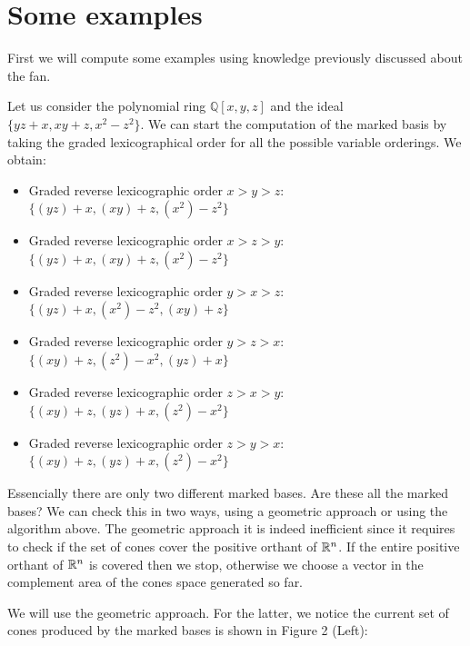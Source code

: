 \section{Some examples}

First we will compute some examples using knowledge previously
discussed about the \grob fan.

\begin{example}
  Let us consider the polynomial ring $\mathbb{Q}[x, y, z]$ and
  the ideal $\{yz + x, xy + z, x^2 -z^2\}$. We can start the computation
  of the marked \grob basis by taking the graded lexicographical order for
  all the possible variable orderings. We obtain:

  \begin{itemize}
  \item Graded reverse lexicographic order $x > y > z$: $\{(yz)+x, (xy)+z, (x^2)-z^2\}$
  \item Graded reverse lexicographic order $x > z > y$: $\{(yz)+x, (xy)+z, (x^2)-z^2\}$
  \item Graded reverse lexicographic order $y > x > z$: $\{(yz)+x, (x^2)-z^2, (xy)+z\}$
  \item Graded reverse lexicographic order $y > z > x$: $\{(xy)+z, (z^2)-x^2, (yz)+x\}$
  \item Graded reverse lexicographic order $z > x > y$: $\{(xy)+z, (yz)+x, (z^2)-x^2\}$
  \item Graded reverse lexicographic order $z > y > x$: $\{(xy)+z, (yz)+x, (z^2)-x^2\}$
  \end{itemize}

  Essencially there are only two different marked \grob bases. Are these all the marked \grob bases?
  We can check this in two ways, using a geometric approach or using the algorithm above. The
  geometric approach it is indeed inefficient since it requires to check if the set of cones
  cover the positive orthant of $\mathbb{R}^n$. If the entire positive orthant of $\mathbb{R}^n$ is covered
  then we stop, otherwise we choose a vector in the complement area of the cones space generated so far.

  We will use the geometric approach. For the latter, we notice the current set of cones produced
  by the marked \grob bases is shown in Figure 2 (Left):


\end{example}
